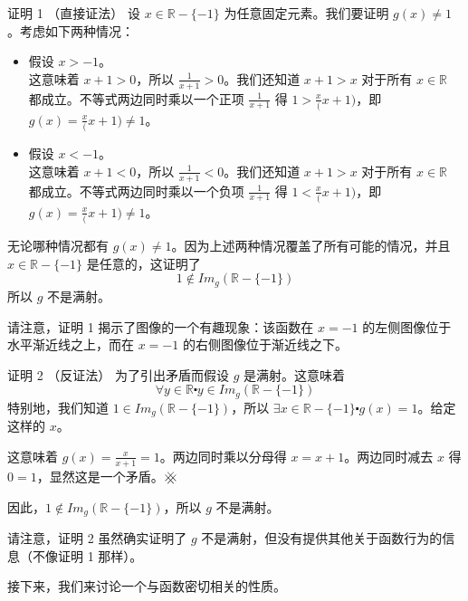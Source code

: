 \begin{example}
    \begin{proofs}{证明 1 （直接证法）}
        设 $x \in \mathbb{R} - \{-1\}$ 为任意固定元素。我们要证明 $g(x) \ne 1$。考虑如下两种情况：
        \begin{itemize}
            \item 假设 $x > -1$。\\
                  这意味着 $x+1>0$，所以 $\frac{1}{x+1}>0$。我们还知道 $x+1>x$ 对于所有 $x \in \mathbb{R}$ 都成立。不等式两边同时乘以一个正项 $\frac{1}{x+1}$ 得 $1 > \frac{x}(x+1)$，即 $g(x) = \frac{x}(x+1) \ne 1$。
            \item 假设 $x < -1$。\\
                  这意味着 $x+1<0$，所以 $\frac{1}{x+1}<0$。我们还知道 $x+1>x$ 对于所有 $x \in \mathbb{R}$ 都成立。不等式两边同时乘以一个负项 $\frac{1}{x+1}$ 得 $1 < \frac{x}(x+1)$，即 $g(x) =  \frac{x}(x+1) \ne 1$。
        \end{itemize}
        无论哪种情况都有 $g(x) \ne 1$。因为上述两种情况覆盖了所有可能的情况，并且 $x \in \mathbb{R} - \{-1\}$ 是任意的，这证明了
        \[1 \notin Im_g(\mathbb{R} - \{-1\})\]
        所以 $g$ 不是满射。
    \end{proofs}

    请注意，证明 1 揭示了图像的一个有趣现象：该函数在 $x = -1$ 的左侧图像位于水平渐近线之上，而在 $x = -1$ 的右侧图像位于渐近线之下。

    \begin{proofs}{证明 2 （反证法）}
        为了引出矛盾而假设 $g$ 是满射。这意味着
        \[\forall y \in \mathbb{R} \centerdot y \in Im_g(\mathbb{R} - \{-1\})\]
        特别地，我们知道 $1 \in Im_g(\mathbb{R} - \{-1\})$，所以 $\exists x \in \mathbb{R} - \{-1\} \centerdot g(x) = 1$。给定这样的 $x$。

        这意味着 $g(x) = \frac{x}{x+1} = 1$。两边同时乘以分母得 $x = x + 1$。两边同时减去 $x$ 得 $0 = 1$，显然这是一个矛盾。$
            \hashx$

        因此，$1 \notin Im_g(\mathbb{R} - \{-1\})$，所以 $g$ 不是满射。
    \end{proofs}

    请注意，证明 2 虽然确实证明了 $g$ 不是满射，但没有提供其他关于函数行为的信息（不像证明 1 那样）。

    接下来，我们来讨论一个与函数密切相关的性质。
\end{example}